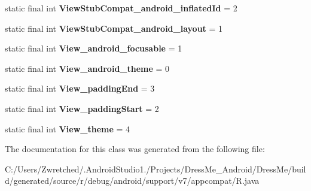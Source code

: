 \begin{DoxyCompactItemize}
\item 
\hypertarget{classandroid_1_1support_1_1v7_1_1appcompat_1_1_r_1_1styleable_a97435b8e5b04b2c3db3118b09480f403}{}static final int {\bfseries View\+Stub\+Compat\+\_\+android\+\_\+inflated\+Id} = 2\label{classandroid_1_1support_1_1v7_1_1appcompat_1_1_r_1_1styleable_a97435b8e5b04b2c3db3118b09480f403}

\item 
\hypertarget{classandroid_1_1support_1_1v7_1_1appcompat_1_1_r_1_1styleable_a1850da4fab00e8c58cb80eccbffa9339}{}static final int {\bfseries View\+Stub\+Compat\+\_\+android\+\_\+layout} = 1\label{classandroid_1_1support_1_1v7_1_1appcompat_1_1_r_1_1styleable_a1850da4fab00e8c58cb80eccbffa9339}

\item 
\hypertarget{classandroid_1_1support_1_1v7_1_1appcompat_1_1_r_1_1styleable_a312f53078ad7e72668c30818eb36f4d5}{}static final int {\bfseries View\+\_\+android\+\_\+focusable} = 1\label{classandroid_1_1support_1_1v7_1_1appcompat_1_1_r_1_1styleable_a312f53078ad7e72668c30818eb36f4d5}

\item 
\hypertarget{classandroid_1_1support_1_1v7_1_1appcompat_1_1_r_1_1styleable_a97295033e07fbae4ddf3760f36497583}{}static final int {\bfseries View\+\_\+android\+\_\+theme} = 0\label{classandroid_1_1support_1_1v7_1_1appcompat_1_1_r_1_1styleable_a97295033e07fbae4ddf3760f36497583}

\item 
\hypertarget{classandroid_1_1support_1_1v7_1_1appcompat_1_1_r_1_1styleable_ab97189cfc89b78ea06021e2de56df41b}{}static final int {\bfseries View\+\_\+padding\+End} = 3\label{classandroid_1_1support_1_1v7_1_1appcompat_1_1_r_1_1styleable_ab97189cfc89b78ea06021e2de56df41b}

\item 
\hypertarget{classandroid_1_1support_1_1v7_1_1appcompat_1_1_r_1_1styleable_ac503580e2e9b985ce96f033596ac9a31}{}static final int {\bfseries View\+\_\+padding\+Start} = 2\label{classandroid_1_1support_1_1v7_1_1appcompat_1_1_r_1_1styleable_ac503580e2e9b985ce96f033596ac9a31}

\item 
\hypertarget{classandroid_1_1support_1_1v7_1_1appcompat_1_1_r_1_1styleable_a6ff12e56eb22350fa07942cc5e70ab5a}{}static final int {\bfseries View\+\_\+theme} = 4\label{classandroid_1_1support_1_1v7_1_1appcompat_1_1_r_1_1styleable_a6ff12e56eb22350fa07942cc5e70ab5a}

\end{DoxyCompactItemize}


The documentation for this class was generated from the following file\+:\begin{DoxyCompactItemize}
\item 
C\+:/\+Users/\+Zwretched/.\+Android\+Studio1./\+Projects/\+Dress\+Me\+\_\+\+Android/\+Dress\+Me/build/generated/source/r/debug/android/support/v7/appcompat/R.\+java\end{DoxyCompactItemize}
